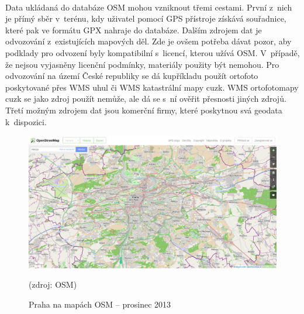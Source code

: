 \documentclass[11pt,a4paper,titlepage,oneside]{book}
\begin{document}


		\paragraph{} Data ukládaná do databáze \acl{OSM} mohou vzniknout třemi ce\-stami. První z~nich je přímý sběr v~terénu, kdy uživatel pomocí GPS přístroje získává souřadnice, které pak ve formátu \ac{GPX} nahraje do databáze. Dalším zdrojem dat je odvozování z~existujících mapových děl. Zde je ovšem potřeba dávat pozor, aby podklady pro odvození  byly kompatibilní s~licencí, kterou užívá \ac{OSM}. V~případě, že nejsou vyjasněny licenční podmínky, materiály použity být nemohou. Pro odvozování na území České republiky se dá kupříkladu použít ortofoto poskytované přes \ac{WMS} \ac{uhul} či \ac{WMS} katastrální mapy \ac{cuzk}\cite{freemap}. \ac{WMS} ortofotomapy \ac{cuzk} se jako zdroj použít nemůže, ale dá se s~ní ověřit přesnosti jiných zdrojů. Třetí možným zdrojem dat jsou komerční firmy, které poskytnou svá geodata k~dispozici.



		\begin{figure}[!h]
			\begin{center}
				\includegraphics[width=12cm]{obrazky/Osm-201312-praha.png}
				\caption{Praha na mapách \ac{OSM} -- prosinec 2013}(zdroj: \ac{OSM}\cite{osm_wikipedia_cs})
				\label{fig:praha2013}
			\end{center}
		\end{figure}



\end{document}
